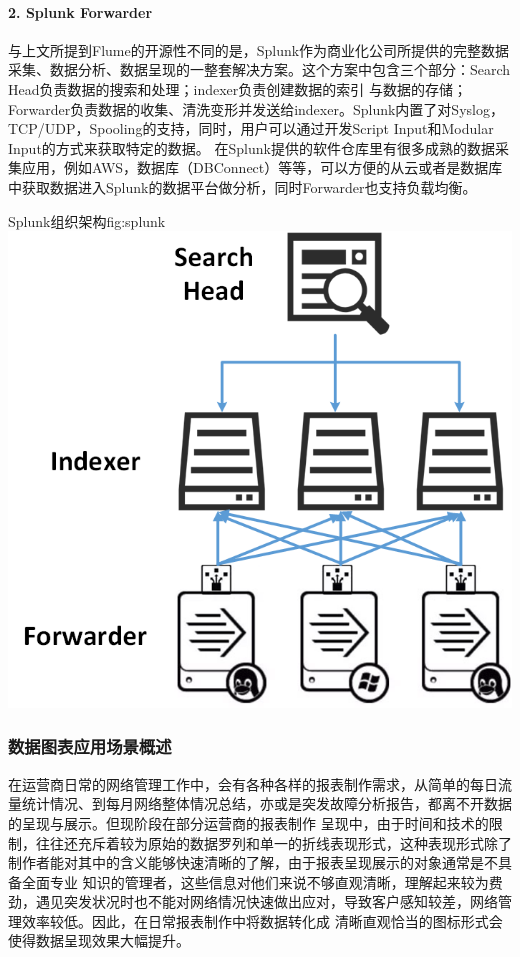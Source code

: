 \documentclass{HustGraduPaper}
\begin{document}
    \paragraph{2. Splunk Forwarder\\}
    
    与上文所提到Flume的开源性不同的是，Splunk作为商业化公司所提供的完整数据采集、数据分析、数据呈现的一整套解决方案。这个方案中包含三个部分：Search Head负责数据的搜索和处理；indexer负责创建数据的索引
    与数据的存储；Forwarder负责数据的收集、清洗变形并发送给indexer。Splunk内置了对Syslog，TCP/UDP，Spooling的支持，同时，用户可以通过开发Script Input和Modular Input的方式来获取特定的数据。
    在Splunk提供的软件仓库里有很多成熟的数据采集应用，例如AWS，数据库（DBConnect）等等，可以方便的从云或者是数据库中获取数据进入Splunk的数据平台做分析，同时Forwarder也支持负载均衡。
    
    \begin{generalfig}[hb]{Splunk组织架构}{fig:splunk} 
        \includegraphics[scale = 0.55]{Figures/splunk.png}
    \end{generalfig}

    \subsubsection{数据图表应用场景概述}
    在运营商日常的网络管理工作中，会有各种各样的报表制作需求，从简单的每日流量统计情况、到每月网络整体情况总结，亦或是突发故障分析报告，都离不开数据的呈现与展示。但现阶段在部分运营商的报表制作
    呈现中，由于时间和技术的限制，往往还充斥着较为原始的数据罗列和单一的折线表现形式，这种表现形式除了制作者能对其中的含义能够快速清晰的了解，由于报表呈现展示的对象通常是不具备全面专业
    知识的管理者，这些信息对他们来说不够直观清晰，理解起来较为费劲，遇见突发状况时也不能对网络情况快速做出应对，导致客户感知较差，网络管理效率较低。因此，在日常报表制作中将数据转化成
    清晰直观恰当的图标形式会使得数据呈现效果大幅提升。
\end{document}

